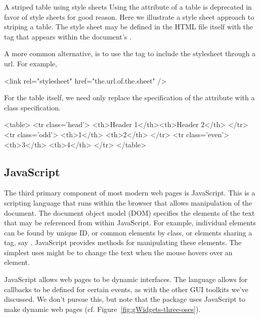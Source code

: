 \begin{example}{A striped table using style sheets}{}
  Using the   attribute of a table is deprecated in favor of
  style sheets for good reason. Here we illustrate a style sheet
  approach to striping a table. The style sheet may be defined in the
  HTML file itself with the  tag that appears within the
  document's . 
  
 A more common alternative, is to use the  tag to include
 the stylesheet through a url. For example,
\begin{HTMLinput}
<link rel="stylesheet" href="the.url.of.the.sheet" />
\end{HTMLinput}

 For the table itself, we need only replace the specification of the attribute with a
 class specification.
 \begin{HTMLinput}
<table>
  <tr class='head'>
    <th>Header 1</th><th>Header 2</th>
  </tr>
  <tr class='odd'>
    <th>1</th> <th>2</th>
  </tr>
  <tr class='even'>
    <th>3</th> <th>4</th>
  </tr>
</table>
\end{HTMLinput}
  
\end{example}


\subsection{JavaScript}
\label{sec:javascript}

The third primary component of most modern web pages is JavaScript. This is a scripting
language that runs within the browser that allows manipulation of the
document. The document object model (DOM) specifies the elements of
the text that may be referenced from within JavaScript. For example,
individual elements can be found by unique ID, or common elements by class, or
elements sharing a tag, say . JavaScript provides methods for
manipulating these elements. The simplest uses might be to change the
text when the mouse hovers over an element.

JavaScript allows web pages to be dynamic interfaces. The language
allows for callbacks to be defined for certain events, as with the
other GUI toolkits we've discussed. We don't pursue this, but note
that the  package uses JavaScript to make dynamic web
pages (cf. Figure~\ref{fig:gWidgets-three-oses}).

